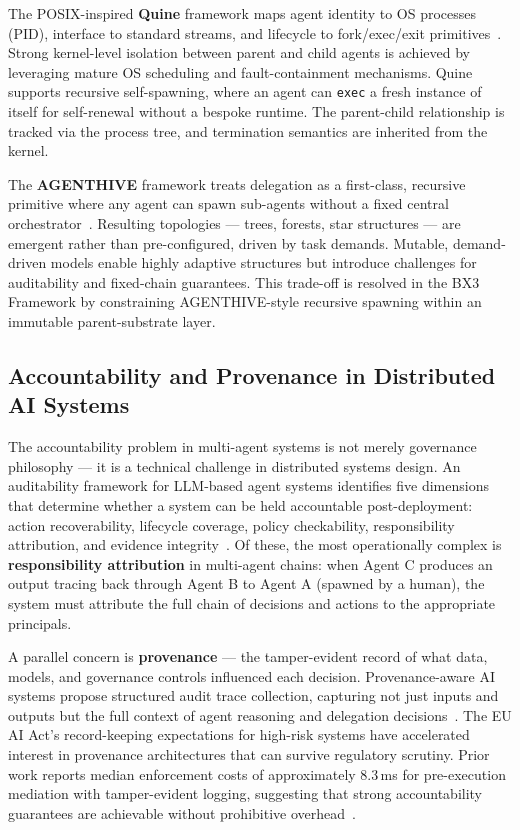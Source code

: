 The POSIX-inspired \textbf{Quine} framework maps agent identity to OS processes (PID), interface to standard streams, and lifecycle to fork/exec/exit primitives~\cite{zhuge2024}. Strong kernel-level isolation between parent and child agents is achieved by leveraging mature OS scheduling and fault-containment mechanisms. Quine supports recursive self-spawning, where an agent can \texttt{exec} a fresh instance of itself for self-renewal without a bespoke runtime. The parent-child relationship is tracked via the process tree, and termination semantics are inherited from the kernel.

The \textbf{AGENTHIVE} framework treats delegation as a first-class, recursive primitive where any agent can spawn sub-agents without a fixed central orchestrator~\cite{agenthive2025}. Resulting topologies — trees, forests, star structures — are emergent rather than pre-configured, driven by task demands. Mutable, demand-driven models enable highly adaptive structures but introduce challenges for auditability and fixed-chain guarantees. This trade-off is resolved in the BX3 Framework by constraining AGENTHIVE-style recursive spawning within an immutable parent-substrate layer.

\subsection{Accountability and Provenance in Distributed AI Systems}
\label{sec:provenance}

The accountability problem in multi-agent systems is not merely governance philosophy — it is a technical challenge in distributed systems design. An auditability framework for LLM-based agent systems identifies five dimensions that determine whether a system can be held accountable post-deployment: action recoverability, lifecycle coverage, policy checkability, responsibility attribution, and evidence integrity~\cite{trusttrack2025}. Of these, the most operationally complex is \textbf{responsibility attribution} in multi-agent chains: when Agent C produces an output tracing back through Agent B to Agent A (spawned by a human), the system must attribute the full chain of decisions and actions to the appropriate principals.

A parallel concern is \textbf{provenance} — the tamper-evident record of what data, models, and governance controls influenced each decision. Provenance-aware AI systems propose structured audit trace collection, capturing not just inputs and outputs but the full context of agent reasoning and delegation decisions~\cite{aer2025}. The EU AI Act's record-keeping expectations for high-risk systems have accelerated interest in provenance architectures that can survive regulatory scrutiny. Prior work reports median enforcement costs of approximately 8.3\,ms for pre-execution mediation with tamper-evident logging, suggesting that strong accountability guarantees are achievable without prohibitive overhead~\cite{vap2026}.


